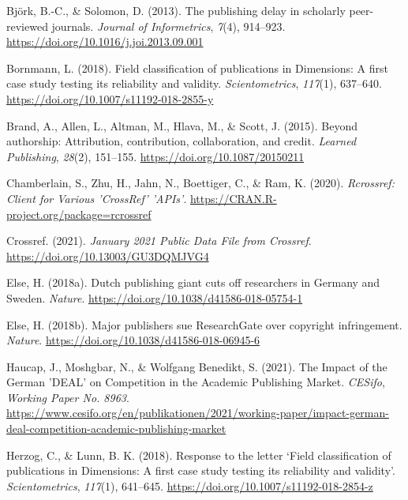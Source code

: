 \documentclass[
]{article}
\newlength{\cslhangindent}
\newlength{\cslentryspacingunit} %
\newenvironment{CSLReferences}[2] %
 {%
  \setlength{\parindent}{0pt}
  \ifodd #1
  \let\oldpar\par
  \def\par{\hangindent=\cslhangindent\oldpar}
  \fi
  \setlength{\parskip}{#2\cslentryspacingunit}
 }%
 {}
\begin{document}
\hypertarget{refs}{}
\begin{CSLReferences}{1}{0}
\leavevmode{}%
Björk, B.-C., \& Solomon, D. (2013). The publishing delay in scholarly peer-reviewed journals. \emph{Journal of Informetrics}, \emph{7}(4), 914--923. \url{https://doi.org/10.1016/j.joi.2013.09.001}

\leavevmode{}%
Bornmann, L. (2018). Field classification of publications in {Dimensions}: A first case study testing its reliability and validity. \emph{Scientometrics}, \emph{117}(1), 637--640. \url{https://doi.org/10.1007/s11192-018-2855-y}

\leavevmode{}%
Brand, A., Allen, L., Altman, M., Hlava, M., \& Scott, J. (2015). Beyond authorship: Attribution, contribution, collaboration, and credit. \emph{Learned Publishing}, \emph{28}(2), 151--155. \url{https://doi.org/10.1087/20150211}

\leavevmode{}%
Chamberlain, S., Zhu, H., Jahn, N., Boettiger, C., \& Ram, K. (2020). \emph{Rcrossref: {Client} for {Various} '{CrossRef}' '{APIs}'}. \url{https://CRAN.R-project.org/package=rcrossref}

\leavevmode{}%
Crossref. (2021). \emph{January 2021 {Public} {Data} {File} from {Crossref}}. \url{https://doi.org/10.13003/GU3DQMJVG4}

\leavevmode{}%
Else, H. (2018a). Dutch publishing giant cuts off researchers in {Germany} and {Sweden}. \emph{Nature}. \url{https://doi.org/10.1038/d41586-018-05754-1}

\leavevmode{}%
Else, H. (2018b). Major publishers sue {ResearchGate} over copyright infringement. \emph{Nature}. \url{https://doi.org/10.1038/d41586-018-06945-6}

\leavevmode{}%
Haucap, J., Moshgbar, N., \& Wolfgang Benedikt, S. (2021). The {Impact} of the {German} '{DEAL}' on {Competition} in the {Academic} {Publishing} {Market}. \emph{CESifo}, \emph{Working Paper No. 8963}. \url{https://www.cesifo.org/en/publikationen/2021/working-paper/impact-german-deal-competition-academic-publishing-market}

\leavevmode{}%
Herzog, C., \& Lunn, B. K. (2018). Response to the letter {`{Field} classification of publications in {Dimensions}: A first case study testing its reliability and validity'}. \emph{Scientometrics}, \emph{117}(1), 641--645. \url{https://doi.org/10.1007/s11192-018-2854-z}


\end{CSLReferences}
\end{document}
